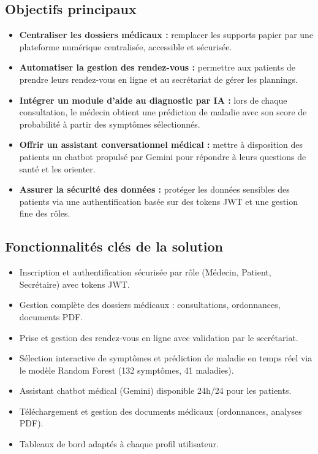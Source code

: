 \documentclass[12pt,a4paper]{report}
\begin{document}
\subsection{Objectifs principaux}

\begin{itemize}
    \item \textbf{Centraliser les dossiers médicaux :} remplacer les supports papier
    par une plateforme numérique centralisée, accessible et sécurisée.

    \item \textbf{Automatiser la gestion des rendez-vous :} permettre aux patients
    de prendre leurs rendez-vous en ligne et au secrétariat de gérer les plannings.

    \item \textbf{Intégrer un module d'aide au diagnostic par IA :} lors de chaque
    consultation, le médecin obtient une prédiction de maladie avec son score de
    probabilité à partir des symptômes sélectionnés.

    \item \textbf{Offrir un assistant conversationnel médical :} mettre à disposition
    des patients un chatbot propulsé par Gemini pour répondre à leurs questions de
    santé et les orienter.

    \item \textbf{Assurer la sécurité des données :} protéger les données sensibles
    des patients via une authentification basée sur des tokens JWT et une gestion
    fine des rôles.
\end{itemize}

\subsection{Fonctionnalités clés de la solution}

\begin{itemize}
    \item Inscription et authentification sécurisée par rôle (Médecin, Patient,
    Secrétaire) avec tokens JWT.

    \item Gestion complète des dossiers médicaux : consultations, ordonnances,
    documents PDF.

    \item Prise et gestion des rendez-vous en ligne avec validation par le
    secrétariat.

    \item Sélection interactive de symptômes et prédiction de maladie en temps
    réel via le modèle Random Forest (132 symptômes, 41 maladies).

    \item Assistant chatbot médical (Gemini) disponible 24h/24 pour les patients.

    \item Téléchargement et gestion des documents médicaux (ordonnances, analyses
    PDF).

    \item Tableaux de bord adaptés à chaque profil utilisateur.
\end{itemize}
\end{document}
